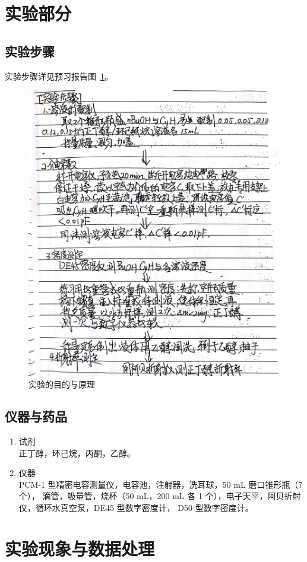 \documentclass[cn,hazy,pku,12pt,normal,math=newtx,cite=super]{elegantnote}
\begin{document}
\section{实验部分}

\subsection{实验步骤}
实验步骤详见预习报告图~\ref{2}。

\begin{figure}[htbp]
    \centering
    \includegraphics[width = .70\textwidth]{image/yxbg_2.jpg}
    \caption{实验的目的与原理}\label{2}
\end{figure}

\subsection{仪器与药品}

\begin{enumerate} %
    \item 试剂 \\   正丁醇，环己烷，丙酮，乙醇。
    \item 仪器 \\   PCM-1 型精密电容测量仪，电容池，注射器，洗耳球，50 mL 磨口锥形瓶（7 个），
    滴管，吸量管，烧杯（50 mL，200 mL 各 1 个），电子天平，阿贝折射仪，循环水真空泵，DE45 型数字密度计，
    D50 型数字密度计。
\end{enumerate}

\section{实验现象与数据处理}
\end{document}
